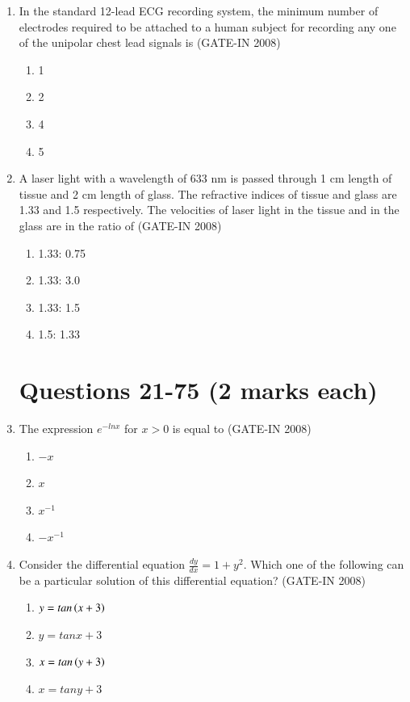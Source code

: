 \documentclass[journal,12pt,onecolumn]{IEEEtran}
\theoremstyle{remark}
\begin{document}
\begin{enumerate}
    \item In the standard 12-lead ECG recording system, the minimum number of electrodes required to be
attached to a human subject for recording any one of the unipolar chest lead signals is \hfill{(GATE-IN 2008)}
\begin{multicols}{4}
    \begin{enumerate} 
        \item 1  
        \item 2
        \item 4
        \item 5
    \end{enumerate}
    \end{multicols}
    
    \item A laser light with a wavelength of 633 nm is passed through 1 cm length of tissue and 2 cm length
of glass. The refractive indices of tissue and glass are 1.33 and 1.5 respectively. The velocities of
laser light in the tissue and in the glass are in the ratio of \hfill{(GATE-IN 2008)}
\begin{multicols}{4}
    \begin{enumerate} 
        \item 1.33: 0.75
        \item 1.33: 3.0
        \item 1.33: 1.5
        \item 1.5: 1.33
    \end{enumerate}
    \end{multicols}

\section*{Questions 21-75 (2 marks each)}
    \item The expression $e^{-lnx}$ for $x > 0$ is equal to \hfill{(GATE-IN 2008)}
    \begin{multicols}{4}
    \begin{enumerate} 
        \item $-x$ 
        \item $x$
        \item $x^{-1}$ 
        \item $-x^{-1}$
    \end{enumerate}
    \end{multicols}
    
    \item Consider the differential equation $\frac{dy}{dx}=1 + y^2$. Which one of the following can be a particular solution of this differential equation? \hfill{(GATE-IN 2008)}
    \begin{multicols}{4}
    \begin{enumerate} 
        \item $y=tan\left(x+3\right)$
        \item $y=tanx + 3$ 
        \item $x=tan\left(y+3\right)$ 
        \item $x=tany + 3$
    \end{enumerate}
    \end{multicols}
    

\end{enumerate}
\end{document}
